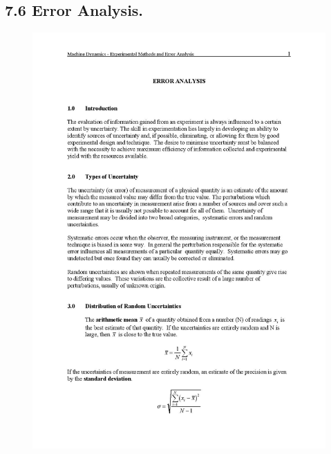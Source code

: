 \documentclass[12pt,a4paper]{report}
\begin{document}
\subsection*{7.6 Error Analysis.}
\begin{figure}[H]
  \includegraphics[width=\linewidth]{error/e1}
  \caption*{}
\label{}
\end{figure}
\end{document}

